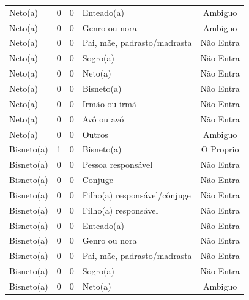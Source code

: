 \documentclass[
	12pt,				%
	openright,			%
	twoside,			%
	a4paper,			%
	english,			%
	french,				%
	spanish,			%
	brazil				%
	]{abntex2}
\begin{document}
\begin{anexosenv}
\begin{longtable}{@{}lcclc@{}}
Neto(a)                      & 0         & 0        & Enteado(a)                   & Ambiguo         \\
Neto(a)                      & 0         & 0        & Genro ou nora                & Ambiguo         \\
Neto(a)                      & 0         & 0        & Pai, mãe, padrasto/madrasta  & Não Entra       \\
Neto(a)                      & 0         & 0        & Sogro(a)                     & Não Entra       \\
Neto(a)                      & 0         & 0        & Neto(a)                      & Não Entra       \\
Neto(a)                      & 0         & 0        & Bisneto(a)                   & Não Entra       \\
Neto(a)                      & 0         & 0        & Irmão ou irmã                & Não Entra       \\
Neto(a)                      & 0         & 0        & Avô ou avó                   & Não Entra       \\
Neto(a)                      & 0         & 0        & Outros                       & Ambiguo         \\
Bisneto(a)                   & 1         & 0        & Bisneto(a)                   & O Proprio       \\
Bisneto(a)                   & 0         & 0        & Pessoa responsável           & Não Entra       \\
Bisneto(a)                   & 0         & 0        & Conjuge                      & Não Entra       \\
Bisneto(a)                   & 0         & 0        & Filho(a) responsável/cônjuge & Não Entra       \\
Bisneto(a)                   & 0         & 0        & Filho(a) responsável         & Não Entra       \\
Bisneto(a)                   & 0         & 0        & Enteado(a)                   & Não Entra       \\
Bisneto(a)                   & 0         & 0        & Genro ou nora                & Não Entra       \\
Bisneto(a)                   & 0         & 0        & Pai, mãe, padrasto/madrasta  & Não Entra       \\
Bisneto(a)                   & 0         & 0        & Sogro(a)                     & Não Entra       \\
Bisneto(a)                   & 0         & 0        & Neto(a)                      & Ambiguo         \\

\end{longtable}
\end{anexosenv}
\end{document}
